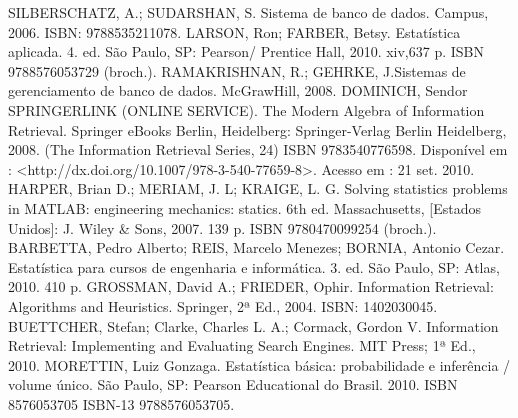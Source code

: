{}{%
    SILBERSCHATZ, A.; SUDARSHAN, S. Sistema de banco de dados. Campus, 2006. ISBN: 9788535211078.
\newline \newline 
LARSON, Ron; FARBER, Betsy. Estatística aplicada. 4. ed. São Paulo, SP: Pearson/ Prentice Hall, 2010. xiv,637 p. ISBN 9788576053729 (broch.).
\newline \newline 
RAMAKRISHNAN, R.; GEHRKE, J.Sistemas de gerenciamento de banco de dados. McGrawHill, 2008. DOMINICH, Sendor SPRINGERLINK (ONLINE SERVICE). 
\newline \newline 
The Modern Algebra of Information Retrieval. Springer eBooks Berlin, Heidelberg: Springer-Verlag Berlin Heidelberg, 2008. (The Information Retrieval Series, 24) ISBN 9783540776598. Disponível em : <http://dx.doi.org/10.1007/978-3-540-77659-8>. Acesso em : 21 set. 2010.
\newline \newline 
HARPER, Brian D.; MERIAM, J. L; KRAIGE, L. G. Solving statistics problems in MATLAB: engineering mechanics: statics. 6th ed. Massachusetts, [Estados Unidos]: J. Wiley \& Sons, 2007. 139 p. ISBN 9780470099254 (broch.).
\newline \newline 
BARBETTA, Pedro Alberto; REIS, Marcelo Menezes; BORNIA, Antonio Cezar. Estatística para cursos de engenharia e informática. 3. ed. São Paulo, SP: Atlas, 2010. 410 p.
\newline \newline 
GROSSMAN, David A.; FRIEDER, Ophir. Information Retrieval: Algorithms and Heuristics. Springer, 2ª Ed., 2004. ISBN: 1402030045.
\newline \newline 
BUETTCHER, Stefan; Clarke, Charles L. A.; Cormack, Gordon V. Information Retrieval: Implementing and Evaluating Search Engines. MIT Press; 1ª Ed., 2010.
\newline \newline 
MORETTIN, Luiz Gonzaga. Estatística básica: probabilidade e inferência / volume único. São Paulo, SP: Pearson Educational do Brasil. 2010. ISBN 8576053705 ISBN-13 9788576053705.
}



